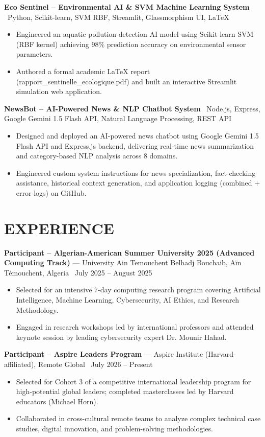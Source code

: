 \documentclass[10.5pt, letterpaper]{article}
\newcommand{\entry}[4]{%
  \noindent\textbf{#1} --- #3, #4 \textbar\ #2\par
  \vspace{2pt}
}
\newcommand{\projectentry}[2]{%
  \noindent\textbf{#1} \textbar\ #2\par
  \vspace{2pt}
}
\newcommand{\resumeItem}[1]{\item #1}
\begin{document}
\projectentry{Eco Sentinel -- Environmental AI \& SVM Machine Learning System}{Python, Scikit-learn, SVM RBF, Streamlit, Glassmorphism UI, LaTeX}
\begin{itemize}
  \resumeItem{Engineered an aquatic pollution detection AI model using Scikit-learn SVM (RBF kernel) achieving 98\% prediction accuracy on environmental sensor parameters.}
  \resumeItem{Authored a formal academic LaTeX report (rapport\_sentinelle\_ecologique.pdf) and built an interactive Streamlit simulation web application.}
\end{itemize}

\projectentry{NewsBot -- AI-Powered News \& NLP Chatbot System}{Node.js, Express, Google Gemini 1.5 Flash API, Natural Language Processing, REST API}
\begin{itemize}
  \resumeItem{Designed and deployed an AI-powered news chatbot using Google Gemini 1.5 Flash API and Express.js backend, delivering real-time news summarization and category-based NLP analysis across 8 domains.}
  \resumeItem{Engineered custom system instructions for news specialization, fact-checking assistance, historical context generation, and application logging (combined + error logs) on GitHub.}
\end{itemize}

\section{EXPERIENCE}

\entry{Participant -- Algerian-American Summer University 2025 (Advanced Computing Track)}{July 2025 -- August 2025}{University Ain Temouchent Belhadj Bouchaib}{Aïn Témouchent, Algeria}
\begin{itemize}
  \resumeItem{Selected for an intensive 7-day computing research program covering Artificial Intelligence, Machine Learning, Cybersecurity, AI Ethics, and Research Methodology.}
  \resumeItem{Engaged in research workshops led by international professors and attended keynote session by leading cybersecurity expert Dr. Mounir Hahad.}
\end{itemize}

\entry{Participant -- Aspire Leaders Program}{July 2026 -- Present}{Aspire Institute (Harvard-affiliated)}{Remote Global}
\begin{itemize}
  \resumeItem{Selected for Cohort 3 of a competitive international leadership program for high-potential global leaders; completed masterclasses led by Harvard educators (Michael Horn).}
  \resumeItem{Collaborated in cross-cultural remote teams to analyze complex technical case studies, digital innovation, and problem-solving methodologies.}
\end{itemize}
\end{document}
